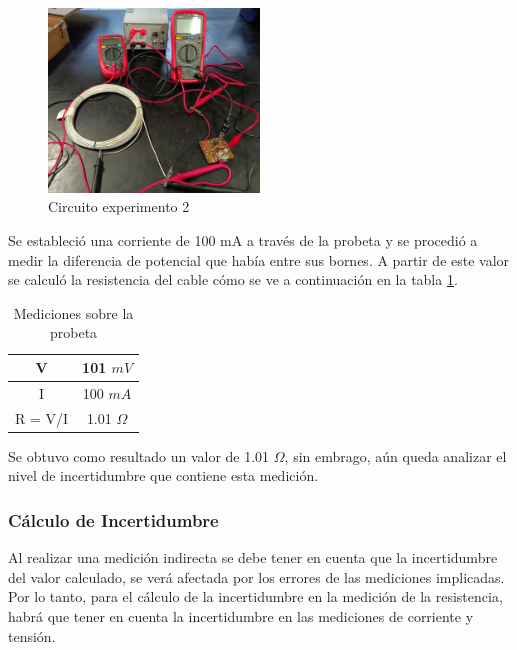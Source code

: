\begin{figure}[h!]
    \centering    \includegraphics[width=0.5\textwidth]{Imagenes/WhatsApp Image 2024-04-11 at 18.13.00.jpeg}
    \caption{Circuito experimento 2}
    \label{fig:foto2}
\end{figure}

Se estableció una corriente de 100 mA a través de la probeta y se procedió a medir la diferencia de potencial que había entre sus bornes. A partir de este valor se calculó la resistencia del cable cómo se ve a continuación en la tabla \ref{tab:exp2a}.


\begin{table}[h!]
    \centering
    \begin{tabular}{|c|c|}
    \hline
        V & 101 $mV$ \\
    \hline
        I & 100 $mA$ \\
    \hline
        R = V/I & 1.01 $\Omega$ \\ 
    \hline
        \end{tabular}
        \def\tablename{Tabla} 
        \caption{Mediciones sobre la probeta}
        \label{tab:exp2a}
\end{table}

Se obtuvo como resultado un valor de 1.01 $\Omega$, sin embrago, aún queda analizar el nivel de incertidumbre que contiene esta medición. 

\subsubsection{Cálculo de Incertidumbre}

Al realizar una medición indirecta se debe tener en cuenta que la incertidumbre del valor calculado, se verá afectada por los errores de las mediciones implicadas. Por lo tanto, para el cálculo de la incertidumbre en la medición de la resistencia, habrá que tener en cuenta la incertidumbre en las mediciones de corriente y tensión.

